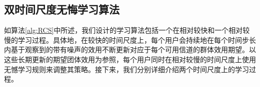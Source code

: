 \subsection{双时间尺度无悔学习算法}

如算法\ref{alg:RCS}中所述，我们设计的学习算法包括一个在相对较快和一个相对较慢的学习过程。具体地，在较快的时间尺度上，每个用户会持续地在每个时间步长内基于观察到的带有噪声的效用不断更新对应于每个可用信道的群体效用期望。以这些长期更新的期望团体效用为参照，每个用户同时在相对较慢的时间尺度上使用无憾学习规则来调整其策略。接下来，我们分别详细介绍两个时间尺度上的学习过程。

